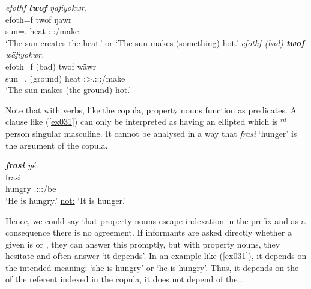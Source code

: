\begin{exe}
	\ex \label{ex495}
	\begin{xlist}
	\ex \emph{efothf \textbf{twof} ŋafiyokwr.}\\
	\gll efoth=f twof ŋawr\\
	sun=\Erg.\Sg{} heat \Stsg:\Sbj:\Nonpast:\Ipfv/make\\
	\trans `The sun creates the heat.' or `The sun makes (something) hot.'
	\label{ex496}
	\ex \emph{efothf (bad) \textbf{twof} wäfiyokwr.}\\
	\gll efoth=f (bad) twof wäwr\\
	sun=\Erg.\Sg{} (ground) heat \Stsg:\Sbj>\Tsg.\F:\Obj:\Nonpast:\Ipfv/make\\
	\trans `The sun makes (the ground) hot.'
	\label{ex497}
	\end{xlist}
\end{exe}

Note that with  verbs, like the copula, property nouns function as  predicates. A clause like (\ref{ex031}) can only be interpreted as having an ellipted  which is \Third{}$^{rd}$ person singular masculine. It cannot be analysed in a way that \emph{frasi} `hunger' is the argument of the copula.

\begin{exe}
	\ex \emph{\textbf{frasi} yé.}\\
	\gll frasi \\
	hungry \Tsg{}.\Masc:\Sbj:\Nonpast:\Ipfv/be\\
	\trans `He is hungry.' \uline{not:} `It is hunger.'
	\label{ex031}
\end{exe}

Hence, we could say that property nouns escape indexation in the  prefix and as a consequence there is no  agreement. If informants are asked directly whether a given  is  or , they can answer this promptly, but with property nouns, they hesitate and often answer `it depends'. In an example like (\ref{ex031}), it depends on the intended meaning: `she is hungry' or `he is hungry'. Thus, it depends on the  of the referent indexed in the copula, it does not depend of the .%


